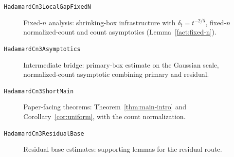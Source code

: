\begin{description}
\item[\texttt{HadamardCn3LocalGapFixedN}]
  Fixed-$n$ analysis: shrinking-box infrastructure with
  $\delta_t=t^{-2/5}$, fixed-$n$ normalized-count and count asymptotics
  (Lemma~\ref{fact:fixed-n}).

\item[\texttt{HadamardCn3Asymptotics}]
  Intermediate bridge: primary-box estimate on the Gaussian scale,
  normalized-count asymptotic combining primary and residual.

\item[\texttt{HadamardCn3ShortMain}]
  Paper-facing theorems: Theorem~\ref{thm:main-intro} and
  Corollary~\ref{cor:uniform}, with the count normalization.

\item[\texttt{HadamardCn3ResidualBase}]
  Residual base estimates: supporting lemmas for the residual route.
\end{description}
